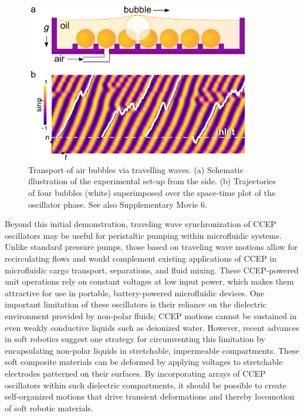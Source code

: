 \begin{figure}[h]
    \centering
    \includegraphics[width=10cm]{figures/3_4.pdf}
    \caption{Transport of air bubbles via travelling waves. (a) Schematic illustration of the experimental set-up from the side. (b) Trajectories of four bubbles (white) superimposed over the space-time plot of the oscillator phase. See also Supplementary Movie 6.}
    \label{fig:3.5}
\end{figure}
Beyond this initial demonstration, traveling wave synchronization of CCEP oscillators may be useful for peristaltic pumping within microfluidic systems. Unlike standard pressure pumps, those based on traveling wave motions allow for recirculating flows\autocite{mi5020289} and would complement existing  applications of CCEP in microfluidic cargo transport\autocite{drews2013ratcheted,cartier2017electric}, separations\autocite{drews2013ratcheted}, and fluid mixing\autocite{cartier2014microfluidic}. These CCEP-powered unit operations rely on constant voltages at low input power, which makes them attractive for use in portable, battery-powered microfluidic devices\autocite{bishop2018contact}.  One important limitation of these oscillators is their reliance on the dielectric environment provided by non-polar fluids; CCEP motions cannot be sustained in even weakly conductive liquids such as deionized water\autocite{cartier2014microfluidic}. However, recent advances in soft robotics suggest one strategy for circumventing this limitation by encapsulating non-polar liquids in stretchable, impermeable compartments\autocite{acome2018hydraulically}. These soft composite materials can be deformed by applying voltages to stretchable electrodes patterned on their surfaces.  By incorporating arrays of CCEP oscillators within such dielectric compartments, it should be possible to create self-organized motions that drive transient deformations and thereby locomotion of soft robotic materials.

